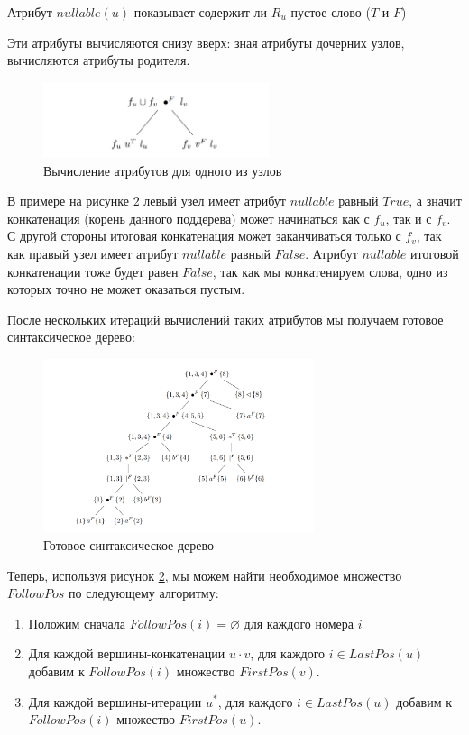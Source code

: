 \begin{Def}
    Атрибут $nullable(u)$ показывает содержит ли $R_u$ пустое слово ($T$ и $F$)
\end{Def}

Эти атрибуты вычисляются снизу вверх: зная атрибуты дочерних
узлов, вычисляются атрибуты родителя.
\begin{figure}[h!tp]
    \centering
    \includegraphics[width = 250px]{images/7.PNG}
    \caption{Вычисление атрибутов для одного из узлов}
    \label{fig:SampleNode}
\end{figure}

В примере на рисунке $2$ левый узел имеет атрибут $nullable$ равный $True$, а значит конкатенация (корень данного поддерева) может начинаться как с $f_u$, так и с $f_v$. С другой стороны итоговая конкатенация может заканчиваться только с $f_v$, так как правый узел имеет атрибут $nullable$ равный $False$. Атрибут $nullable$ итоговой конкатенации тоже будет равен $False$, так как мы конкатенируем слова, одно из которых точно не может оказаться пустым.


После нескольких итераций вычислений таких атрибутов мы получаем готовое синтаксическое дерево:
\newpage
\begin{figure}[h!t!p]
    \centering
    \includegraphics[width = 300px]{images/ЗаполненноеСинтаксическоеДерево.PNG}
    \caption{Готовое синтаксическое дерево}
    \label{fig:SyntaxTree2}
\end{figure}


Теперь, используя рисунок \ref{fig:SyntaxTree2}, мы можем найти необходимое множество $FollowPos$ по следующему алгоритму:
\begin{enumerate}
    \item Положим сначала $FollowPos(i) = \varnothing$ для каждого номера $i$
    \item Для каждой вершины-конкатенации $u\cdot v$, для каждого $i \in LastPos(u)$ добавим к $FollowPos(i)$ множество $FirstPos(v)$.
    \item Для каждой вершины-итерации $u^{*}$, для каждого $i \in LastPos(u)$ добавим к
          \\$FollowPos(i)$  множество $FirstPos(u)$.
\end{enumerate}

